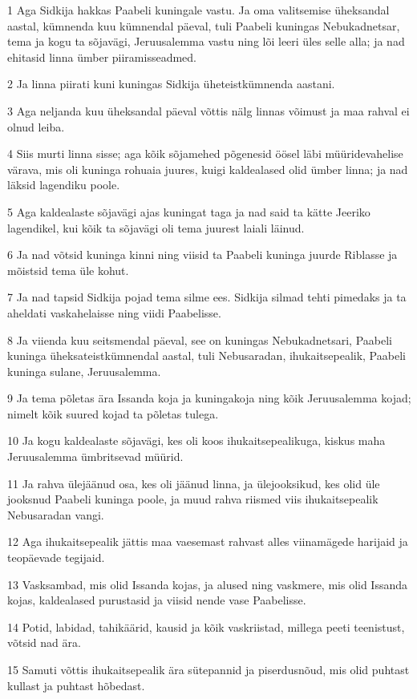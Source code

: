 \par 1 Aga Sidkija hakkas Paabeli kuningale vastu. Ja oma valitsemise üheksandal aastal, kümnenda kuu kümnendal päeval, tuli Paabeli kuningas Nebukadnetsar, tema ja kogu ta sõjavägi, Jeruusalemma vastu ning lõi leeri üles selle alla; ja nad ehitasid linna ümber piiramisseadmed.
\par 2 Ja linna piirati kuni kuningas Sidkija üheteistkümnenda aastani.
\par 3 Aga neljanda kuu üheksandal päeval võttis nälg linnas võimust ja maa rahval ei olnud leiba.
\par 4 Siis murti linna sisse; aga kõik sõjamehed põgenesid öösel läbi müüridevahelise värava, mis oli kuninga rohuaia juures, kuigi kaldealased olid ümber linna; ja nad läksid lagendiku poole.
\par 5 Aga kaldealaste sõjavägi ajas kuningat taga ja nad said ta kätte Jeeriko lagendikel, kui kõik ta sõjavägi oli tema juurest laiali läinud.
\par 6 Ja nad võtsid kuninga kinni ning viisid ta Paabeli kuninga juurde Riblasse ja mõistsid tema üle kohut.
\par 7 Ja nad tapsid Sidkija pojad tema silme ees. Sidkija silmad tehti pimedaks ja ta aheldati vaskahelaisse ning viidi Paabelisse.
\par 8 Ja viienda kuu seitsmendal päeval, see on kuningas Nebukadnetsari, Paabeli kuninga üheksateistkümnendal aastal, tuli Nebusaradan, ihukaitsepealik, Paabeli kuninga sulane, Jeruusalemma.
\par 9 Ja tema põletas ära Issanda koja ja kuningakoja ning kõik Jeruusalemma kojad; nimelt kõik suured kojad ta põletas tulega.
\par 10 Ja kogu kaldealaste sõjavägi, kes oli koos ihukaitsepealikuga, kiskus maha Jeruusalemma ümbritsevad müürid.
\par 11 Ja rahva ülejäänud osa, kes oli jäänud linna, ja ülejooksikud, kes olid üle jooksnud Paabeli kuninga poole, ja muud rahva riismed viis ihukaitsepealik Nebusaradan vangi.
\par 12 Aga ihukaitsepealik jättis maa vaesemast rahvast alles viinamägede harijaid ja teopäevade tegijaid.
\par 13 Vasksambad, mis olid Issanda kojas, ja alused ning vaskmere, mis olid Issanda kojas, kaldealased purustasid ja viisid nende vase Paabelisse.
\par 14 Potid, labidad, tahikäärid, kausid ja kõik vaskriistad, millega peeti teenistust, võtsid nad ära.
\par 15 Samuti võttis ihukaitsepealik ära sütepannid ja piserdusnõud, mis olid puhtast kullast ja puhtast hõbedast.
